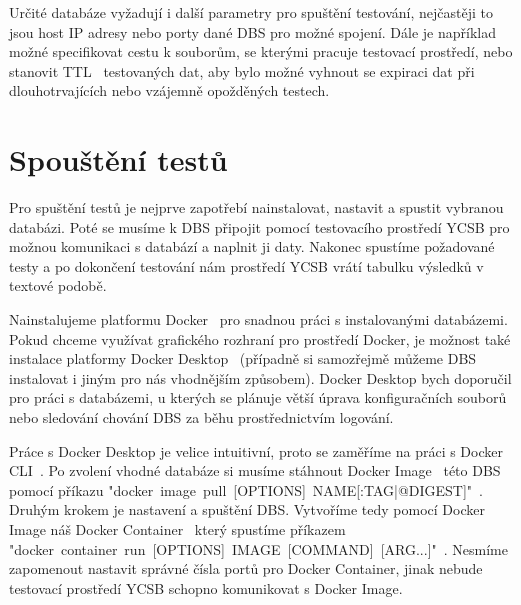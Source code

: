 \documentclass[czech,master,dept460,male,csharp,cpdeclaration]{diploma}
\begin{document}
	Určité databáze vyžadují i další parametry pro spuštění testování, nejčastěji to jsou host IP adresy nebo porty dané DBS pro možné spojení. Dále je například možné specifikovat cestu k souborům, se kterými pracuje testovací prostředí, nebo stanovit TTL~\cite{ttl} testovaných dat, aby bylo možné vyhnout se expiraci dat při dlouhotrvajících nebo vzájemně opožděných testech.
	
	\section{Spouštění testů}
	
	Pro spuštění testů je nejprve zapotřebí nainstalovat, nastavit a spustit vybranou databázi. Poté se musíme k DBS připojit pomocí testovacího prostředí YCSB pro možnou komunikaci s databází a naplnit ji daty. Nakonec spustíme požadované testy a po dokončení testování nám prostředí YCSB vrátí tabulku výsledků v textové podobě.
	
	Nainstalujeme platformu Docker~\cite{docker-console} pro snadnou práci s instalovanými databázemi. Pokud chceme využívat grafického rozhraní pro prostředí Docker, je možnost také instalace platformy Docker Desktop~\cite{docker-desktop, docker-cli} (případně si samozřejmě můžeme DBS instalovat i jiným pro nás vhodnějším způsobem). Docker Desktop bych doporučil pro práci s databázemi, u kterých se plánuje větší úprava konfiguračních souborů nebo sledování chování DBS za běhu prostřednictvím logování.
	
	Práce s Docker Desktop je velice intuitivní, proto se zaměříme na práci s Docker CLI~\cite{docker-cli}. Po zvolení vhodné databáze si musíme stáhnout Docker Image~\cite{docker-image-container} této DBS~\cite{docker-hub} pomocí příkazu "docker~image~pull~[OPTIONS]~NAME[:TAG|@DIGEST]"~\cite{docker-image-pull}. Druhým krokem je nastavení a spuštění DBS. Vytvoříme tedy pomocí Docker Image náš Docker Container~\cite{docker-image-container} který spustíme příkazem "docker~container~run~[OPTIONS]~IMAGE~[COMMAND]~[ARG...]"~\cite{docker-container-run}. Nesmíme zapomenout nastavit správné čísla portů pro Docker Container, jinak nebude testovací prostředí YCSB schopno komunikovat s Docker Image. 
	
\end{document}
